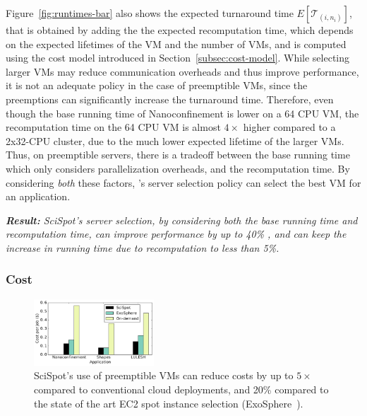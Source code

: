 Figure~\ref{fig:runtimes-bar} also shows the expected turnaround time $E[\mathcal{T}_{(i,n_i)}]$, that is obtained by adding the the expected recomputation time, which depends on the expected lifetimes of the VM and the number of VMs, and is computed using the cost model introduced in Section~\ref{subsec:cost-model}. 
While selecting larger VMs may reduce communication overheads and thus improve performance, it is not an adequate policy in the case of preemptible VMs, since the preemptions can significantly increase the turnaround time.
Therefore, even though the base running time of Nanoconfinement is lower on a 64 CPU VM, the recomputation time on the 64 CPU VM is almost $4\times$ higher compared to a 2x32-CPU cluster,  due to the much lower expected lifetime of the larger VMs. 
Thus, on preemptible servers, there is a tradeoff between the base running time which only considers parallelization overheads, and the recomputation time.
By considering \emph{both} these factors, \sysname's server selection policy can select the best VM for an application. 


\noindent \emph{\textbf{Result:} SciSpot's server selection, by considering both the base running time and recomputation time, can improve performance by up to 40\% , and can keep the increase in running time due to recomputation to less than 5\%.}

\subsubsection{Cost}


\begin{figure}
  \centering
  \includegraphics[width=0.4\textwidth]{../graphs/cost-vs-exosphere.pdf}
  \vspace*{\myfigspace}
  \caption{SciSpot's use of preemptible VMs can reduce costs by up to $5\times$ compared to conventional cloud deployments, and 20\% compared to the state of the art EC2 spot instance selection (ExoSphere~\cite{exosphere}).}
  \label{fig:cost-only-bar}
    \vspace*{\myfigspace}
\end{figure}

